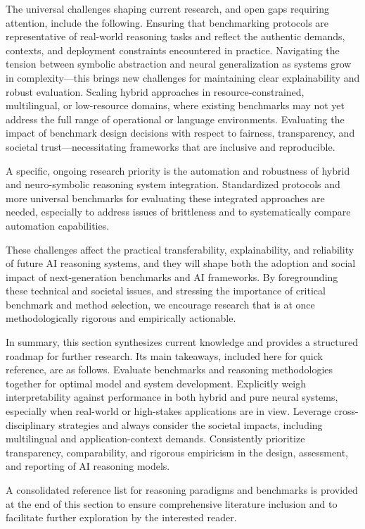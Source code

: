 \documentclass[sigconf]{acmart}
\begin{document}
The universal challenges shaping current research, and open gaps requiring attention, include the following.
Ensuring that benchmarking protocols are representative of real-world reasoning tasks and reflect the authentic demands, contexts, and deployment constraints encountered in practice.
Navigating the tension between symbolic abstraction and neural generalization as systems grow in complexity—this brings new challenges for maintaining clear explainability and robust evaluation.
Scaling hybrid approaches in resource-constrained, multilingual, or low-resource domains, where existing benchmarks may not yet address the full range of operational or language environments.
Evaluating the impact of benchmark design decisions with respect to fairness, transparency, and societal trust—necessitating frameworks that are inclusive and reproducible.

A specific, ongoing research priority is the automation and robustness of hybrid and neuro-symbolic reasoning system integration. Standardized protocols and more universal benchmarks for evaluating these integrated approaches are needed, especially to address issues of brittleness and to systematically compare automation capabilities.

These challenges affect the practical transferability, explainability, and reliability of future AI reasoning systems, and they will shape both the adoption and social impact of next-generation benchmarks and AI frameworks. By foregrounding these technical and societal issues, and stressing the importance of critical benchmark and method selection, we encourage research that is at once methodologically rigorous and empirically actionable.

In summary, this section synthesizes current knowledge and provides a structured roadmap for further research. Its main takeaways, included here for quick reference, are as follows.
Evaluate benchmarks and reasoning methodologies together for optimal model and system development.
Explicitly weigh interpretability against performance in both hybrid and pure neural systems, especially when real-world or high-stakes applications are in view.
Leverage cross-disciplinary strategies and always consider the societal impacts, including multilingual and application-context demands.
Consistently prioritize transparency, comparability, and rigorous empiricism in the design, assessment, and reporting of AI reasoning models.

A consolidated reference list for reasoning paradigms and benchmarks is provided at the end of this section to ensure comprehensive literature inclusion and to facilitate further exploration by the interested reader.
\end{document}
